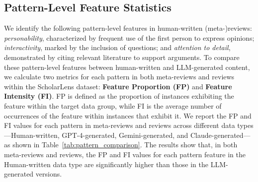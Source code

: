 







\subsection{Pattern-Level Feature Statistics}
We identify the following pattern-level features in human-written (meta-)reviews: \textit{personability}, characterized by frequent use of the first person to express opinions; \textit{interactivity}, marked by the inclusion of questions; and \textit{attention to detail}, demonstrated by citing relevant literature to support arguments. 
To compare these pattern-level features between human-written and LLM-generated content, we calculate two metrics for each pattern in both meta-reviews and reviews within the ScholarLens dataset: \textbf{Feature Proportion (FP)} and \textbf{Feature Intensity (FI)}. FP is defined as the proportion of instances exhibiting the feature within the target data group, while FI is the average number of occurrences of the feature within instances that exhibit it. We report the FP and FI values for each pattern in meta-reviews and reviews across different data types—Human-written, GPT-4-generated, Gemini-generated, and Claude-generated— as shown in Table~\ref{tab:pattern_comparison}.
The results show that, in both meta-reviews and reviews, the FP and FI values for each pattern feature in the Human-written data type are significantly higher than those in the LLM-generated versions.


